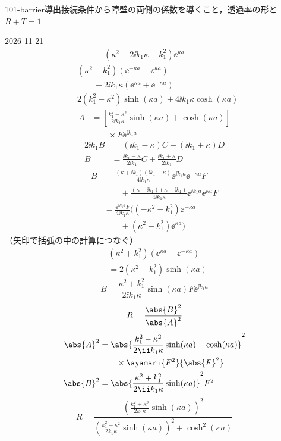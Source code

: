 \documentclass[uplatex,dvipdfmx,a4paper,11pt]{jsarticle}
\begin{document}
\begin{mondai}{101-barrier}{導出}{接続条件から障壁の両側の係数を導くこと，透過率の形と $R+T=1$}
\begin{kotaeutsushi}{2026-11-21}
\begin{align*}
&\qquad-(\kappa^{2}-2\ii k_{1}\kappa-k_{1}^{2})\ee^{\kappa a}\\
&(\kappa^{2}-k_{1}^{2})(\ee^{-\kappa a}-\ee^{\kappa a})\\
&\qquad+2\ii k_{1}\kappa(\ee^{\kappa a}+\ee^{-\kappa a})\\
&2(k_{1}^{2}-\kappa^{2})\sinh(\kappa a)+4\ii k_{1}\kappa\cosh(\kappa a)
\end{align*}
\begin{align*}
A&=\left[\frac{k_{1}^{2}-\kappa^{2}}{2\ii k_{1}\kappa}\sinh(\kappa a)+\cosh(\kappa a)\right]\\
&\qquad\times F\ee^{\ii k_{1}a}
\end{align*}
\begin{align*}
2\ii k_{1}B&=(\ii k_{1}-\kappa)C+(\ii k_{1}+\kappa)D\\
B&=\frac{\ii k_{1}-\kappa}{2\ii k_{1}}C+\frac{\ii k_{1}+\kappa}{2\ii k_{1}}D
\end{align*}
\begin{align*}
B&=\frac{(\kappa+\ii k_{1})(\ii k_{1}-\kappa)}{4\ii k_{1}\kappa}\ee^{\ii k_{1}a}\ee^{-\kappa a}F\\
&\qquad+\frac{(\kappa-\ii k_{1})(\kappa+\ii k_{1})}{4\ii k_{1}\kappa}\ee^{\ii k_{1}a}\ee^{\kappa a}F\\
&=\frac{\ee^{\ii k_{1}a}F}{4\ii k_{1}\kappa}\bigl((-\kappa^{2}-k_{1}^{2})\ee^{-\kappa a}\\
&\qquad+(\kappa^{2}+k_{1}^{2})\ee^{\kappa a}\bigr)
\end{align*}
（矢印で括弧の中の計算につなぐ）
\begin{align*}
&(\kappa^{2}+k_{1}^{2})(\ee^{\kappa a}-\ee^{-\kappa a})\\
&=2(\kappa^{2}+k_{1}^{2})\sinh(\kappa a)
\end{align*}
\[ B=\frac{\kappa^{2}+k_{1}^{2}}{2\ii k_{1}\kappa}\sinh(\kappa a)F\ee^{\ii k_{1}a} \]
\[ R=\frac{\abs{B}^{2}}{\abs{A}^{2}} \]
\begin{align*}
\abs{A}^{2}&=\abs{\frac{k_{1}^{2}-\kappa^{2}}{2\ii k_{1}\kappa}\sinh(\kappa a)+\cosh(\kappa a)}^{2}\\
&\qquad\times\ayamari{F^{2}}{\abs{F}^{2}}\\
\abs{B}^{2}&=\abs{\frac{\kappa^{2}+k_{1}^{2}}{2\ii k_{1}\kappa}\sinh(\kappa a)}^{2}F^{2}
\end{align*}
\[ R=\frac{\left(\frac{k_{1}^{2}+\kappa^{2}}{2k_{1}\kappa}\sinh(\kappa a)\right)^{2}}{\left(\frac{k_{1}^{2}-\kappa^{2}}{2k_{1}\kappa}\sinh(\kappa a)\right)^{2}+\cosh^{2}(\kappa a)} \]

\end{kotaeutsushi}
\end{mondai}
\end{document}
